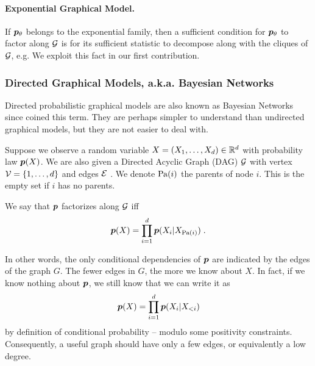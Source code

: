 \paragraph{Exponential Graphical Model.}
If $\bm{p}_{\theta}$ belongs to the exponential family, then a sufficient condition for $\bm{p}_{\theta}$  to factor along ${\mathcal G}$ is for its sufficient statistic to decompose along with the cliques of ${\mathcal G}$, e.g.
We exploit this fact in our first contribution.


\subsubsection{Directed Graphical Models, a.k.a. Bayesian Networks}
Directed probabilistic graphical models are also known as Bayesian Networks since \citet{pearl1985bayesian} coined this term.
They are perhaps simpler to understand than undirected graphical models, but they are not easier to deal with.

Suppose we observe a random variable $X=(X_1, \dots, X_d) \in \mathbb{R}^d$ with probability law $\bm{p}(X)$.
We are also given a Directed Acyclic Graph (DAG) ${\mathcal G}$ with vertex ${\mathcal V}=\{1, \dots, d \}$ and edges ${\mathcal E}$ .
We denote $\operatorname{\mathrm{Pa}}(i)$ the parents of node $i$.
This is the empty set if $i$ has no parents.
\begin{definition}
	We say that $\bm{p}$ factorizes along ${\mathcal G}$ iff
	\begin{align}
		\bm{p}(X) = \prod_{i=1}^d \bm{p}(X_i | X_{\operatorname{\mathrm{Pa}}(i)}) \; .
	\end{align}
\end{definition}
In other words, the only conditional dependencies of $\bm{p}$ are indicated by the edges of the graph $G$. The fewer edges in $G$, the more we know about $X$. In fact, if we know nothing about $\bm{p}$, we still know that we can write it as
\begin{align}
	\bm{p}(X) = \prod_{i=1}^d \bm{p}(X_i | X_{<i} )
\end{align}
by definition of conditional probability -- modulo some positivity constraints. Consequently, a useful graph should have only a few edges, or equivalently a low degree.

